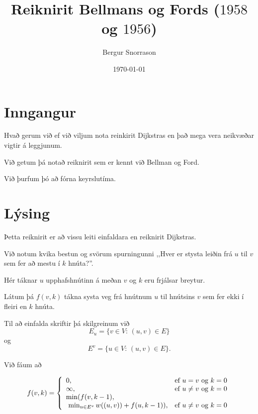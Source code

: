 \title{Reiknirit Bellmans og Fords ($1958$ og $1956$)}
\author{Bergur Snorrason}
\date{\today}



\frame{\titlepage}

\section{Inngangur}
{
    {
        \item<1-> Hvað gerum við ef við viljum nota reinkirit Dijkstras en það mega vera neikvæðar vigtir á leggjunum.
            \item<2-> Við getum þá notað reiknirit sem er kennt við Bellman og Ford.
            \item<3-> Við þurfum þó að fórna keyrslutíma.
    }
}

\section{Lýsing}
{
    {
        \item<1-> Þetta reiknirit er að vissu leiti einfaldara en reiknirit Dijkstras.
            \item<2-> Við notum kvika bestun og svörum spurningunni ,,Hver er stysta leiðin frá $u$ til $v$ sem fer að mestu í $k$ hnúta?''.
            \item<3-> Hér táknar $u$ upphafshnútinn á meðan $v$ og $k$ eru frjálsar breytur.
            \item<4-> Látum þá $f(v, k)$ tákna systa veg frá hnútnum $u$ til hnútsins $v$ sem fer ekki í fleiri en $k$ hnúta.
            \item<5-> Til að einfalda skriftir þá skilgreinum við
            \[
            E_u = \{v \in V:\, (u, v) \in E\}
        \]
            og
            \[
            E^v = \{u \in V:\, (u, v) \in E\}.
                \]
                \item<6-> Við fáum að
    }
    {
        \[
            f(v, k) = \left \{
                \env{array}
        { {l l}
            0, & \text{ef $u = v$ og $k = 0$}\\
                \infty, & \text{ef $u \neq v$ og $k = 0$}\\
                \min(f(v, k - 1), & \\
                        \ \min_{u \in E^v} w((u, v)) + f(u, k - 1)), & \text{ef $u \neq v$ og $k = 0$}\\
        }
        \right .
            \]
    }
}

